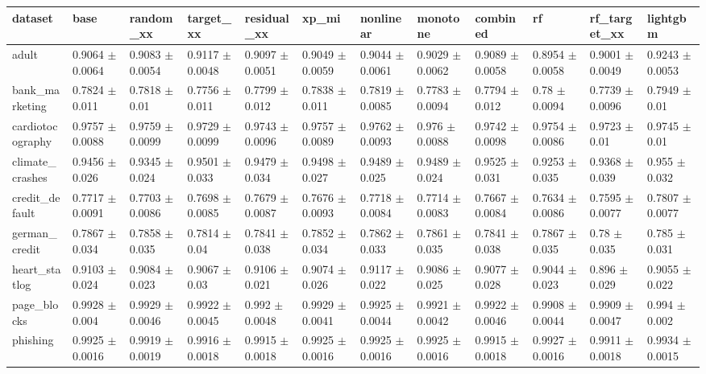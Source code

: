 \begin{tabular}{llllllllllll}
\toprule
dataset & base & random\_xx & target\_xx & residual\_xx & xp\_mi & nonlinear & monotone & combined & rf & rf\_target\_xx & lightgbm \\
\midrule
adult & 0.9064 $\pm$ 0.0064 & 0.9083 $\pm$ 0.0054 & 0.9117 $\pm$ 0.0048 & 0.9097 $\pm$ 0.0051 & 0.9049 $\pm$ 0.0059 & 0.9044 $\pm$ 0.0061 & 0.9029 $\pm$ 0.0062 & 0.9089 $\pm$ 0.0058 & 0.8954 $\pm$ 0.0058 & 0.9001 $\pm$ 0.0049 & 0.9243 $\pm$ 0.0053 \\
bank\_marketing & 0.7824 $\pm$ 0.011 & 0.7818 $\pm$ 0.01 & 0.7756 $\pm$ 0.011 & 0.7799 $\pm$ 0.012 & 0.7838 $\pm$ 0.011 & 0.7819 $\pm$ 0.0085 & 0.7783 $\pm$ 0.0094 & 0.7794 $\pm$ 0.012 & 0.78 $\pm$ 0.0094 & 0.7739 $\pm$ 0.0096 & 0.7949 $\pm$ 0.01 \\
cardiotocography & 0.9757 $\pm$ 0.0088 & 0.9759 $\pm$ 0.0099 & 0.9729 $\pm$ 0.0099 & 0.9743 $\pm$ 0.0096 & 0.9757 $\pm$ 0.0089 & 0.9762 $\pm$ 0.0093 & 0.976 $\pm$ 0.0088 & 0.9742 $\pm$ 0.0098 & 0.9754 $\pm$ 0.0086 & 0.9723 $\pm$ 0.01 & 0.9745 $\pm$ 0.01 \\
climate\_crashes & 0.9456 $\pm$ 0.026 & 0.9345 $\pm$ 0.024 & 0.9501 $\pm$ 0.033 & 0.9479 $\pm$ 0.034 & 0.9498 $\pm$ 0.027 & 0.9489 $\pm$ 0.025 & 0.9489 $\pm$ 0.024 & 0.9525 $\pm$ 0.031 & 0.9253 $\pm$ 0.035 & 0.9368 $\pm$ 0.039 & 0.955 $\pm$ 0.032 \\
credit\_default & 0.7717 $\pm$ 0.0091 & 0.7703 $\pm$ 0.0086 & 0.7698 $\pm$ 0.0085 & 0.7679 $\pm$ 0.0087 & 0.7676 $\pm$ 0.0093 & 0.7718 $\pm$ 0.0084 & 0.7714 $\pm$ 0.0083 & 0.7667 $\pm$ 0.0084 & 0.7634 $\pm$ 0.0086 & 0.7595 $\pm$ 0.0077 & 0.7807 $\pm$ 0.0077 \\
german\_credit & 0.7867 $\pm$ 0.034 & 0.7858 $\pm$ 0.035 & 0.7814 $\pm$ 0.04 & 0.7841 $\pm$ 0.038 & 0.7852 $\pm$ 0.034 & 0.7862 $\pm$ 0.033 & 0.7861 $\pm$ 0.035 & 0.7841 $\pm$ 0.038 & 0.7867 $\pm$ 0.035 & 0.78 $\pm$ 0.035 & 0.785 $\pm$ 0.031 \\
heart\_statlog & 0.9103 $\pm$ 0.024 & 0.9084 $\pm$ 0.023 & 0.9067 $\pm$ 0.03 & 0.9106 $\pm$ 0.021 & 0.9074 $\pm$ 0.026 & 0.9117 $\pm$ 0.022 & 0.9086 $\pm$ 0.025 & 0.9077 $\pm$ 0.028 & 0.9044 $\pm$ 0.023 & 0.896 $\pm$ 0.029 & 0.9055 $\pm$ 0.022 \\
page\_blocks & 0.9928 $\pm$ 0.004 & 0.9929 $\pm$ 0.0046 & 0.9922 $\pm$ 0.0045 & 0.992 $\pm$ 0.0048 & 0.9929 $\pm$ 0.0041 & 0.9925 $\pm$ 0.0044 & 0.9921 $\pm$ 0.0042 & 0.9922 $\pm$ 0.0046 & 0.9908 $\pm$ 0.0044 & 0.9909 $\pm$ 0.0047 & 0.994 $\pm$ 0.002 \\
phishing & 0.9925 $\pm$ 0.0016 & 0.9919 $\pm$ 0.0019 & 0.9916 $\pm$ 0.0018 & 0.9915 $\pm$ 0.0018 & 0.9925 $\pm$ 0.0016 & 0.9925 $\pm$ 0.0016 & 0.9925 $\pm$ 0.0016 & 0.9915 $\pm$ 0.0018 & 0.9927 $\pm$ 0.0016 & 0.9911 $\pm$ 0.0018 & 0.9934 $\pm$ 0.0015 \\

\end{tabular}
